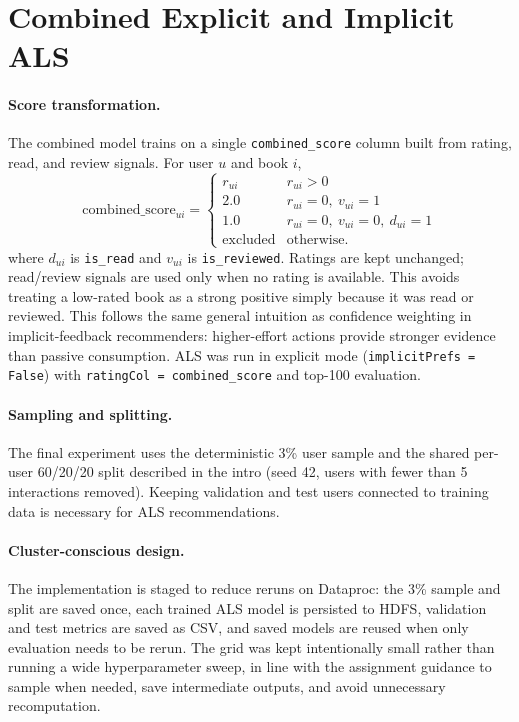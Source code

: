 \documentclass[10pt,twocolumn]{article}
\begin{document}
\section{Combined Explicit and Implicit ALS}

\paragraph{Score transformation.} The combined model trains on a single \texttt{combined\_score} column built from rating, read, and review signals. For user $u$ and book $i$,
\[
\text{combined\_score}_{ui} =
\begin{cases}
r_{ui} & r_{ui} > 0 \\
2.0    & r_{ui} = 0,\ v_{ui} = 1 \\
1.0    & r_{ui} = 0,\ v_{ui} = 0,\ d_{ui} = 1 \\
\text{excluded} & \text{otherwise.}
\end{cases}
\]
where $d_{ui}$ is \texttt{is\_read} and $v_{ui}$ is \texttt{is\_reviewed}. Ratings are kept unchanged; read/review signals are used only when no rating is available. This avoids treating a low-rated book as a strong positive simply because it was read or reviewed. This follows the same general intuition as confidence weighting in implicit-feedback recommenders: higher-effort actions provide stronger evidence than passive consumption. ALS was run in explicit mode (\texttt{implicitPrefs = False}) with \texttt{ratingCol = combined\_score} and top-100 evaluation.

\paragraph{Sampling and splitting.} The final experiment uses the deterministic 3\% user sample and the shared per-user 60/20/20 split described in the intro (seed 42, users with fewer than 5 interactions removed). Keeping validation and test users connected to training data is necessary for ALS recommendations.

\paragraph{Cluster-conscious design.} The implementation is staged to reduce reruns on Dataproc: the 3\% sample and split are saved once, each trained ALS model is persisted to HDFS, validation and test metrics are saved as CSV, and saved models are reused when only evaluation needs to be rerun. The grid was kept intentionally small rather than running a wide hyperparameter sweep, in line with the assignment guidance to sample when needed, save intermediate outputs, and avoid unnecessary recomputation.
\end{document}
